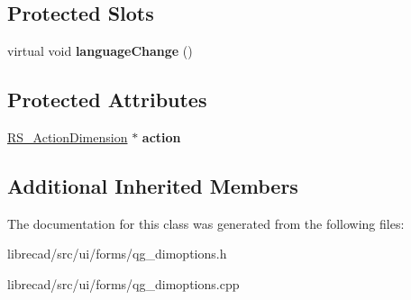 \subsection*{Protected Slots}
\begin{DoxyCompactItemize}
\item 
\hypertarget{classQG__DimOptions_a01de2adc0b469e161bf9537aad53f6c7}{virtual void {\bfseries language\-Change} ()}\label{classQG__DimOptions_a01de2adc0b469e161bf9537aad53f6c7}

\end{DoxyCompactItemize}
\subsection*{Protected Attributes}
\begin{DoxyCompactItemize}
\item 
\hypertarget{classQG__DimOptions_af015392e0de3a8be93e89a255ff3ab85}{\hyperlink{classRS__ActionDimension}{R\-S\-\_\-\-Action\-Dimension} $\ast$ {\bfseries action}}\label{classQG__DimOptions_af015392e0de3a8be93e89a255ff3ab85}

\end{DoxyCompactItemize}
\subsection*{Additional Inherited Members}


The documentation for this class was generated from the following files\-:\begin{DoxyCompactItemize}
\item 
librecad/src/ui/forms/qg\-\_\-dimoptions.\-h\item 
librecad/src/ui/forms/qg\-\_\-dimoptions.\-cpp\end{DoxyCompactItemize}
